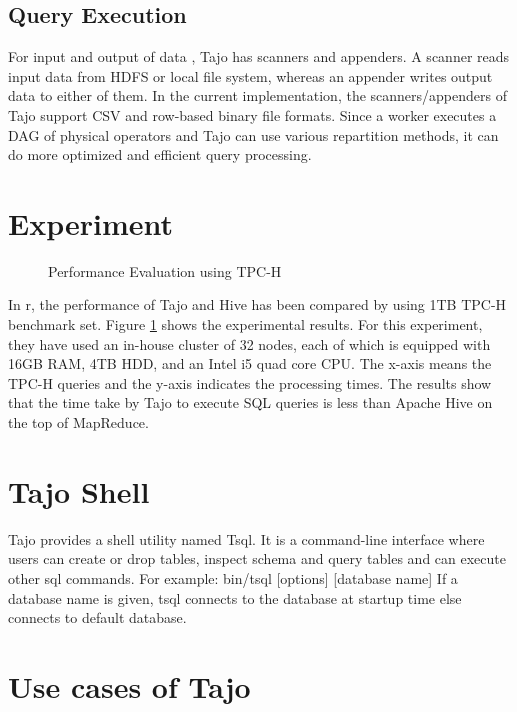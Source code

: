 \documentclass[9pt,twocolumn,twoside]{../../styles/osajnl}
\begin{document}
\subsection{Query Execution}
For input and output of data \cite{tajo-paper}, Tajo has scanners and
appenders. A scanner reads input data from HDFS or local file system,
whereas an appender writes output data to either of them. In the
current implementation, the scanners/appenders of Tajo support CSV and
row-based binary file formats. Since a worker executes a DAG of
physical operators and Tajo can use various repartition methods, it
can do more optimized and efficient query processing.

\section{Experiment}


\begin{figure}[htbp]
\centering
{}
\caption{\cite{tajo-paper} Performance Evaluation using TPC-H}
\label{fig:experiments}
\end{figure}

\noindent
In \cite{tajo-paper}r, the performance of Tajo and Hive has been
compared by using 1TB TPC-H benchmark set. Figure
\ref{fig:experiments} shows the experimental results. For this
experiment, they have used an in-house cluster of 32 nodes, each of
which is equipped with 16GB RAM, 4TB HDD, and an Intel i5 quad core
CPU. The x-axis means the TPC-H queries and the y-axis indicates the
processing times. The results show that the time take by Tajo to
execute SQL queries is less than Apache Hive on the top of MapReduce.

\section{Tajo Shell}
Tajo provides a shell utility named \cite{www-apache-tajo-tsql}
Tsql. It is a command-line interface where users can create or drop
tables, inspect schema and query tables and can execute other sql
commands.\newline \newline
\noindent
For example: bin/tsql [options] [database name] \newline If a database
name is given, tsql connects to the database at startup time else
connects to default database.

\section{Use cases of Tajo}
\end{document}
